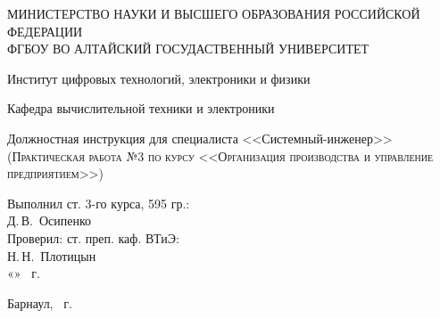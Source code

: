 \documentclass[a4paper, 12pt, twoside]{article}
\begin{document}
\begin{titlepage}
  \begin{center}
    \MakeUppercase{Министерство науки и высшего образования Российской Федерации} \\
    \MakeUppercase{ФГБОУ ВО Алтайский госудаственный университет}
    \vspace{0.25cm}
    
	  Институт цифровых технологий, электроники и физики
    
    Кафедра вычислительной техники и электроники
    \vfill
    
    {\LARGE Должностная инструкция для специалиста <<Системный-инженер>>}\\[5mm]
    \textsc{(Практическая работа №3 по курсу <<Организация производства и управление предприятием>>)}
  \bigskip

\end{center}
\vfill

\newlength{\ML}
\hfill
\begin{minipage}{0.45\textwidth}
  Выполнил ст. 3-го курса, 595 гр.:\\
  \underline{\hspace{\ML}} Д.\,В.~Осипенко\\
  Проверил: ст. преп. каф. ВТиЭ:\\
  \underline{\hspace{\ML}} Н.\,Н.~Плотицын\\
  «\underline{\hspace{0.7cm}}» \underline{\hspace{2cm}} \the\year~г.
\end{minipage}%
\vfill

\begin{center}
  Барнаул, \the\year~г.
\end{center}
\end{titlepage}
\tableofcontents
\newpage

\end{document}
